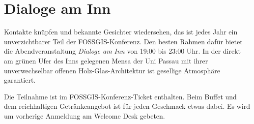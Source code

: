 \newpage
\thispagestyle{mensastyle}
\section*{Dialoge am Inn}
\label{social-event}
Kontakte knüpfen und bekannte Gesichter wiedersehen, das ist jedes Jahr ein unverzichtbarer Teil der
FOSSGIS-Konferenz. Den besten Rahmen dafür bietet die Abendveranstaltung \emph{Dialoge am Inn} von 19:00
bis 23:00 Uhr. In der
direkt am grünen Ufer des Inns gelegenen Mensa der Uni Passau mit ihrer unverwechselbar offenen
Holz-Glas-Architektur ist gesellige Atmosphäre garantiert.

Die Teilnahme ist im
FOSSGIS-Konferenz-Ticket enthalten. Beim Buffet und dem reichhaltigen Getränkeangebot ist für jeden
Geschmack etwas dabei. Es wird um vorherige Anmeldung am Welcome Desk gebeten.
\newpage


\vfill

